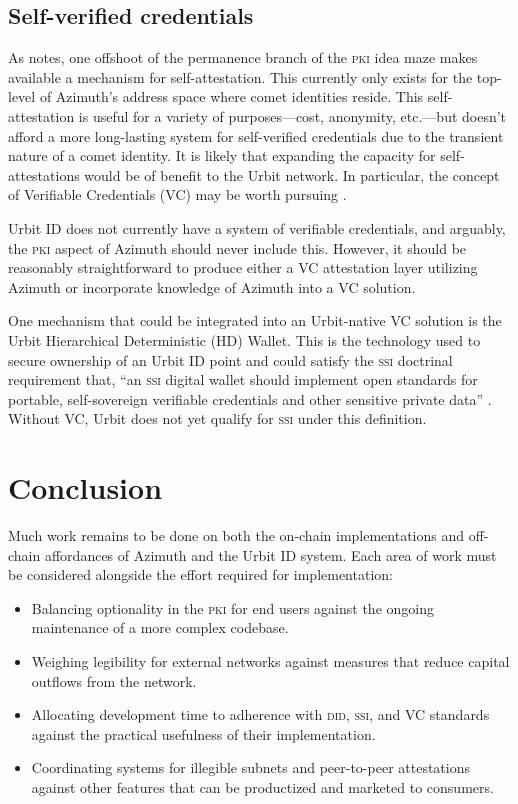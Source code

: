 \documentclass[twoside]{article}
\begin{document}
\subsection{Self-verified credentials}

As  notes, one offshoot of the permanence branch of the \textsc{pki} idea maze makes available a mechanism for self-attestation. This currently only exists for the top-level of Azimuth's address space where comet identities reside. This self-attestation is useful for a variety of purposes—cost, anonymity, etc.—but doesn't afford a more long-lasting system for self-verified credentials due to the transient nature of a comet identity. It is likely that expanding the capacity for self-attestations would be of benefit to the Urbit network. In particular, the concept of Verifiable Credentials (VC) may be worth pursuing \citep{W3C2022a}.

Urbit ID does not currently have a system of verifiable credentials, and arguably, the \textsc{pki} aspect of Azimuth should never include this. However, it should be reasonably straightforward to produce either a VC attestation layer utilizing Azimuth or incorporate knowledge of Azimuth into a VC solution.

One mechanism that could be integrated into an Urbit-native VC solution is the Urbit Hierarchical Deterministic (HD) Wallet. This is the technology used to secure ownership of an Urbit ID point and could satisfy the \textsc{ssi} doctrinal requirement that, ``an \textsc{ssi} digital wallet should implement open standards for portable, self-sovereign verifiable credentials and other sensitive private data'' \citep{Preukschat2021}. Without VC, Urbit does not yet qualify for \textsc{ssi} under this definition.


\section{Conclusion}

Much work remains to be done on both the on-chain implementations and off-chain affordances of Azimuth and the Urbit ID system. Each area of work must be considered alongside the effort required for implementation:

\begin{itemize}
  \item  Balancing optionality in the \textsc{pki} for end users against the ongoing maintenance of a more complex codebase.
  \item  Weighing legibility for external networks against measures that reduce capital outflows from the network.
  \item  Allocating development time to adherence with \textsc{did}, \textsc{ssi}, and VC standards against the practical usefulness of their implementation.
  \item  Coordinating systems for illegible subnets and peer-to-peer attestations against other features that can be productized and marketed to consumers.
\end{itemize}
\end{document}
